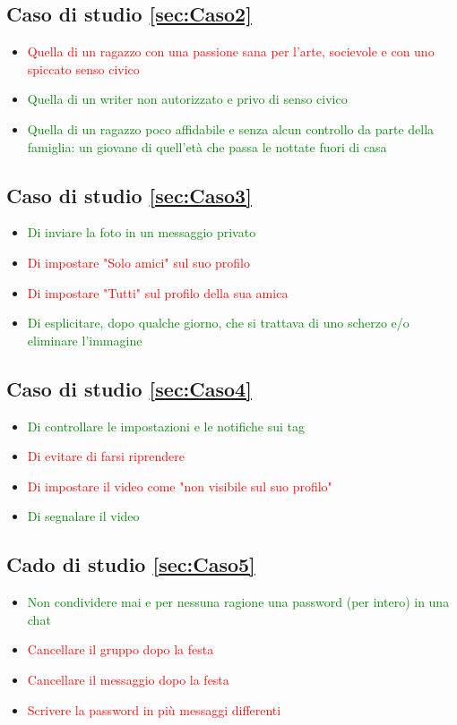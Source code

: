 \documentclass{article}
\begin{document}
	\subsection{Caso di studio \ref{sec:Caso2}}
		\begin{itemize}
			\item \textcolor{red}{Quella di un ragazzo con una passione sana per l’arte, socievole e con uno spiccato senso civico}
			\item \textcolor{green}{Quella di un writer non autorizzato e privo di senso civico}
			\item \textcolor{green}{Quella di un ragazzo poco affidabile e senza alcun controllo da parte della famiglia: un giovane di quell’età che passa le nottate fuori di casa}
		\end{itemize}
	\subsection{Caso di studio \ref{sec:Caso3}}
	\begin{itemize}
		\item \textcolor{green}{Di inviare la foto in un messaggio privato}
		\item \textcolor{red}{Di impostare "Solo amici" sul suo profilo}
		\item \textcolor{red}{Di impostare "Tutti" sul profilo della sua amica}
		\item \textcolor{green}{Di esplicitare, dopo qualche giorno, che si trattava di uno scherzo e/o eliminare l'immagine}
	\end{itemize}
\subsection{Caso di studio \ref{sec:Caso4}}
\begin{itemize}
	\item \textcolor{green}{Di controllare le impostazioni e le notifiche sui tag}
	\item \textcolor{red}{Di evitare di farsi riprendere}
	\item \textcolor{red}{Di impostare il video come "non visibile sul suo profilo"}
	\item \textcolor{green}{Di segnalare il video}
\end{itemize}
\subsection{Cado di studio \ref{sec:Caso5}}
\begin{itemize}
	\item \textcolor{green}{Non condividere mai e per nessuna ragione una password (per intero) in una chat}
	\item \textcolor{red}{Cancellare il gruppo dopo la festa}
	\item \textcolor{red}{Cancellare il messaggio dopo la festa}
	\item \textcolor{red}{Scrivere la password in più messaggi differenti}
\end{itemize}
\end{document}
